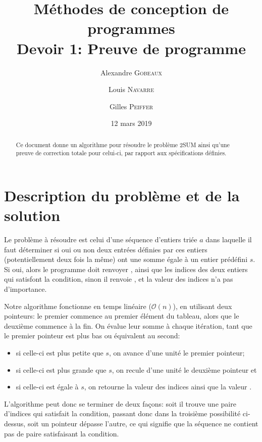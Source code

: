 \documentclass{elsarticle}
\begin{document}
\title{Méthodes de conception de programmes \\ Devoir 1: Preuve de programme}
\date{12 mars 2019}

\address[add1]{École Polytechnique, Université catholique de Louvain, Place de l'Université 1, 1348 Ottignies-Louvain-la-Neuve, Belgique}

\author[add1]{Alexandre \textsc{Gobeaux}}
\author[add1]{Louis \textsc{Navarre}}
\author[add1]{Gilles \textsc{Peiffer}}

\begin{abstract}
Ce document donne un algorithme pour résoudre le problème 2SUM ainsi qu'une preuve de correction totale pour celui-ci, par rapport aux spécifications définies.
\end{abstract}
\maketitle

\section{Description du problème et de la solution}
Le problème à résoudre est celui d'une séquence d'entiers triée $a$ dans laquelle il faut déterminer si oui ou non deux entrées définies par ces entiers (potentiellement deux fois la même) ont une somme égale à un entier prédéfini $s$.
Si oui, alors le programme doit renvoyer \og {} \fg, ainsi que les indices des deux entiers qui satisfont la condition, sinon il renvoie \og {} \fg, et la valeur des indices n'a pas d'importance.

Notre algorithme fonctionne en temps linéaire ($\mathcal{O}(n)$), en utilisant deux pointeurs:
le premier commence au premier élément du tableau, alors que le deuxième commence à la fin.
On évalue leur somme à chaque itération, tant que le premier pointeur est plus bas ou équivalent au second:
\begin{itemize}
	\item si celle-ci est plus petite que $s$, on avance d'une unité le premier pointeur;
	\item si celle-ci est plus grande que $s$, on recule d'une unité le deuxième pointeur et
	\item si celle-ci est égale à $s$, on retourne la valeur des indices ainsi que la valeur \og {}\fg.
\end{itemize}
L'algorithme peut donc se terminer de deux façons: soit il trouve une paire d'indices qui satisfait la condition, passant donc dans la troisième possibilité ci-dessus,
soit un pointeur dépasse l'autre, ce qui signifie que la séquence ne contient pas de paire satisfaisant la condition. %
\end{document}
